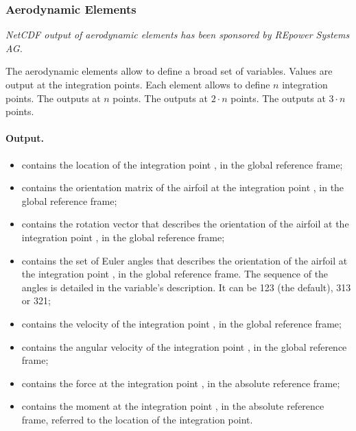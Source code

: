 \subsubsection{Aerodynamic Elements}
\label{sec:NetCDF:Elem:Aerodynamic}
\emph{NetCDF output of aerodynamic elements has been sponsored
by REpower Systems AG.}

The aerodynamic elements allow to define a broad set of variables.
Values are output at the integration points.
Each element allows to define $n$ integration points.
The  outputs at $n$ points.
The  outputs at $2 \cdot n$ points.
The  outputs at $3 \cdot n$ points.

\paragraph{Output.}
\begin{itemize}
\item {} contains the location
of the integration point , in the global reference frame;

\item {} contains the orientation matrix
of the airfoil at the integration point , in the global reference frame;

\item {} contains the rotation vector
that describes the orientation of the airfoil at the integration point ,
in the global reference frame;

\item {} contains the set of Euler angles
that describes the orientation of the airfoil at the integration point ,
in the global reference frame.
The sequence of the angles is detailed in the variable's description.
It can be 123 (the default), 313 or 321;

\item {} contains the velocity
of the integration point , in the global reference frame;

\item {} contains the angular velocity
of the integration point , in the global reference frame;

\item {} contains the force
at the integration point , in the absolute reference frame;

\item {} contains the moment
at the integration point , in the absolute reference frame,
referred to the location of the integration point.
\end{itemize}

